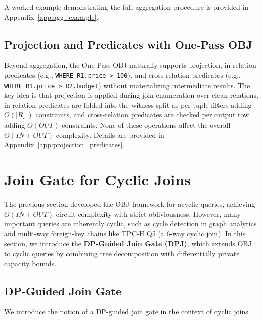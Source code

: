 \documentclass[sigconf]{acmart}
\begin{document}
A worked example demonstrating the full aggregation procedure is provided in Appendix~\ref{app:agg_example}.

\subsection{Projection and Predicates with One-Pass OBJ}
\label{subsec:projection_predicates}

Beyond aggregation, the One-Pass OBJ naturally supports projection, in-relation predicates (e.g., \texttt{WHERE R1.price > 100}), and cross-relation predicates (e.g., \texttt{WHERE R1.price > R2.budget}) without materializing intermediate results. The key idea is that projection is applied during join enumeration over clean relations, in-relation predicates are folded into the witness split as per-tuple filters adding $O(|R_i|)$ constraints, and cross-relation predicates are checked per output row adding $O(\mathit{OUT})$ constraints. None of these operations affect the overall $O(\mathit{IN} + \mathit{OUT})$ complexity. Details are provided in Appendix~\ref{app:projection_predicates}.


\section{Join Gate for Cyclic Joins}
\label{subsec:cyclic_decomposition}

The previous section developed the OBJ framework for acyclic queries, achieving $O(\mathit{IN} + \mathit{OUT})$ circuit complexity with strict obliviousness. However, many important queries are inherently cyclic, such as cycle detection in graph analytics and multi-way foreign-key chains like TPC-H Q5 (a $6$-way cyclic join). In this section, we introduce the \textbf{DP-Guided Join Gate (DPJ)}, which extends OBJ to cyclic queries by combining tree decomposition with differentially private capacity bounds.


\subsection{DP-Guided Join Gate}
We introduce the notion of a DP-guided join gate in the context of cyclic joins.
\end{document}
